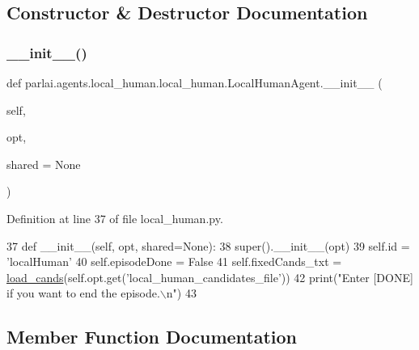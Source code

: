 \subsection{Constructor \& Destructor Documentation}
\mbox{\label{classparlai_1_1agents_1_1local__human_1_1local__human_1_1LocalHumanAgent_ae6f3a4687b2a0c78d55f43bd89960fb0}} 
\subsubsection{\texorpdfstring{\+\_\+\+\_\+init\+\_\+\+\_\+()}{\_\_init\_\_()}}
{\footnotesize\ttfamily def parlai.\+agents.\+local\+\_\+human.\+local\+\_\+human.\+Local\+Human\+Agent.\+\_\+\+\_\+init\+\_\+\+\_\+ (\begin{DoxyParamCaption}\item[{}]{self,  }\item[{}]{opt,  }\item[{}]{shared = {\ttfamily None} }\end{DoxyParamCaption})}



Definition at line 37 of file local\+\_\+human.\+py.


\begin{DoxyCode}
37     \textcolor{keyword}{def }\_\_init\_\_(self, opt, shared=None):
38         super().\_\_init\_\_(opt)
39         self.id = \textcolor{stringliteral}{'localHuman'}
40         self.episodeDone = \textcolor{keyword}{False}
41         self.fixedCands\_txt = \hyperlink{namespaceparlai_1_1utils_1_1misc_ad935ab0a9d49b897c5e3efdbe1c46c4d}{load\_cands}(self.opt.get(\textcolor{stringliteral}{'local\_human\_candidates\_file'}))
42         print(\textcolor{stringliteral}{"Enter [DONE] if you want to end the episode.\(\backslash\)n"})
43 
\end{DoxyCode}


\subsection{Member Function Documentation}
\mbox{\label{classparlai_1_1agents_1_1local__human_1_1local__human_1_1LocalHumanAgent_a8959f66f1f70152c13552f99f5b10067}} 

